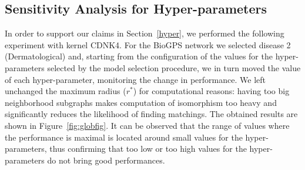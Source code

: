 \documentclass[review]{elsarticle}
\begin{document}
\subsection{Sensitivity Analysis for Hyper-parameters}
In order to support our claims in Section~\ref{hyper}, we performed the following experiment with kernel CDNK4. For the BioGPS network we selected disease 2 (Dermatological)
and, starting from the configuration of the values for the hyper-parameters selected by the model selection procedure, we in turn moved the value of each hyper-parameter, monitoring the change in performance. We left unchanged the maximum radius ($r^*$) for computational reasons: having too big neighborhood subgraphs makes computation of isomorphism too heavy and significantly reduces the likelihood of finding matchings. The obtained results are shown in Figure~\ref{fig:globfig}.
It can be observed that the range of values where the performance is maximal is located around small values for the hyper-parameters, thus confirming that too low or too high values for the hyper-parameters do not bring good performances.
\end{document}
